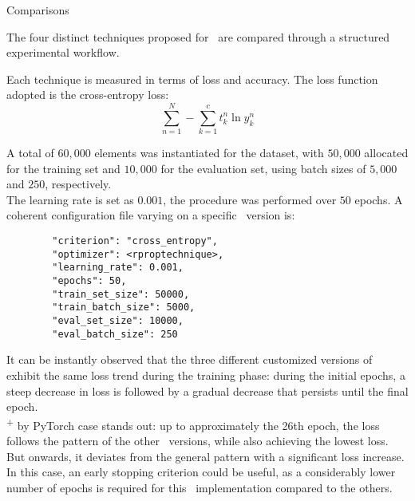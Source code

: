 \begin{section}{Comparisons}
    \par The four distinct techniques proposed for~ are compared through a structured experimental workflow.
    \par Each technique is measured in terms of loss and accuracy. The loss function adopted is the cross-entropy loss:
    \[
        \sum_{n=1}^{N} - \sum_{k=1}^{c} t_{k}^{n} \ln y_{k}^{n}
    \]
    \par A total of $60,000$ elements was instantiated for the dataset, with $50,000$ allocated for the training set and $10,000$ for the evaluation set, using batch sizes of $5,000$ and $250$, respectively.\\
    The learning rate is set as $0.001$, the procedure was performed over $50$ epochs. A coherent configuration file varying on a specific~ version is:
    \begin{verbatim}
        "criterion": "cross_entropy",
        "optimizer": <rproptechnique>,
        "learning_rate": 0.001,
        "epochs": 50,
        "train_set_size": 50000,
        "train_batch_size": 5000,
        "eval_set_size": 10000,
        "eval_batch_size": 250
    \end{verbatim}
    \begin{figure}[h!]
        \centering
        \begin{subfigure}[b]{0.48\textwidth}
            \centering
            
            \label{fig:training_loss}
        \end{subfigure}
        \hfill
        \begin{subfigure}[b]{0.48\textwidth}
            \centering
            
            \label{fig:evaluation_loss}
        \end{subfigure}
    \end{figure}
    \par It can be instantly observed that the three different customized versions of~ exhibit the same loss trend during the training phase: during the initial epochs, a steep decrease in loss is followed by a gradual decrease that persists until the final epoch.\\
    \textsuperscript{+} by PyTorch case stands out: up to approximately the 26th epoch, the loss follows the pattern of the other~ versions, while also achieving the lowest loss. But onwards, it deviates from the general pattern with a significant loss increase. In this case, an early stopping criterion could be useful, as a considerably lower number of epochs is required for this~ implementation compared to the others.

\end{section}
